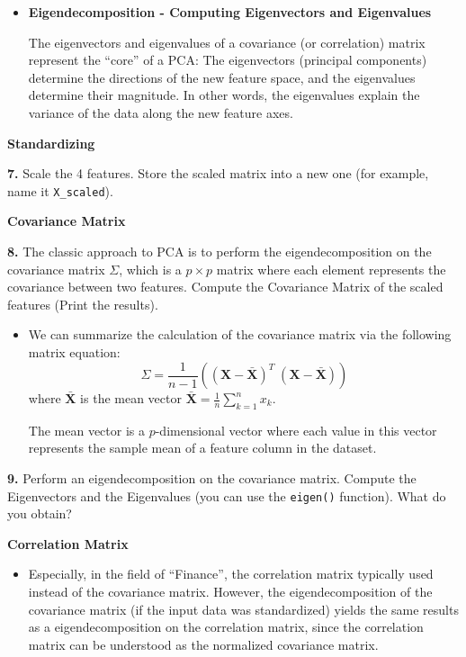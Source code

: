 \documentclass[]{book}
\newenvironment{rmdblock}[1]
  {\begin{shaded*}
  \begin{itemize}
  \renewcommand{\labelitemi}{
    \raisebox{-.7\height}[0pt][0pt]{
      {\setkeys{Gin}{width=2em,keepaspectratio}\texttt{[image: img/icons/\#1]}}
    }
  }
  \item
  }
  {
  \end{itemize}
  \end{shaded*}
  }
\newenvironment{rmdinsight}
  {\begin{rmdblock}{insight}}
  {\end{rmdblock}}
\newenvironment{rmdtip}
  {\begin{rmdblock}{tip}}
  {\end{rmdblock}}
\theoremstyle{definition}
\theoremstyle{definition}
\theoremstyle{definition}
\theoremstyle{remark}
\begin{document}
\begin{rmdinsight}
\textbf{Eigendecomposition - Computing Eigenvectors and Eigenvalues}

The eigenvectors and eigenvalues of a covariance (or correlation) matrix
represent the ``core'' of a PCA: The eigenvectors (principal components)
determine the directions of the new feature space, and the eigenvalues
determine their magnitude. In other words, the eigenvalues explain the
variance of the data along the new feature axes.
\end{rmdinsight}

\textbf{Standardizing}

\textbf{7.} Scale the 4 features. Store the scaled matrix into a new one
(for example, name it \texttt{X\_scaled}).

\textbf{Covariance Matrix}

\textbf{8.} The classic approach to PCA is to perform the
eigendecomposition on the covariance matrix \(\Sigma\), which is a
\(p\times p\) matrix where each element represents the covariance
between two features. Compute the Covariance Matrix of the scaled
features (Print the results).

\begin{rmdtip}
We can summarize the calculation of the covariance matrix via the
following matrix equation:
\[ \Sigma = \frac{1}{n-1} \left( (\mathbf{X} - \mathbf{\bar{X}})^T\;(\mathbf{X} - \mathbf{\bar{X}}) \right) \]
where \(\mathbf{\bar{X}}\) is the mean vector
\(\mathbf{\bar{X}} = \frac{1}{n} \sum\limits_{k=1}^n x_{k}\).

The mean vector is a \(p\)-dimensional vector where each value in this
vector represents the sample mean of a feature column in the dataset.
\end{rmdtip}

\textbf{9.} Perform an eigendecomposition on the covariance matrix.
Compute the Eigenvectors and the Eigenvalues (you can use the
\texttt{eigen()} function). What do you obtain?

\textbf{Correlation Matrix}

\begin{rmdinsight}
Especially, in the field of ``Finance'', the correlation matrix
typically used instead of the covariance matrix. However, the
eigendecomposition of the covariance matrix (if the input data was
standardized) yields the same results as a eigendecomposition on the
correlation matrix, since the correlation matrix can be understood as
the normalized covariance matrix.
\end{rmdinsight}
\end{document}
